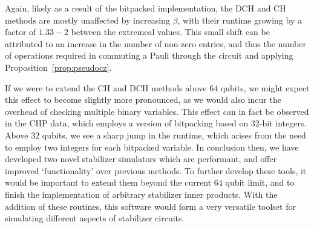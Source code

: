 Again, likely as a result of the bitpacked implementation, the DCH and CH methods are mostly unaffected by increasing $\beta$, with their runtime growing by a factor of $1.33-2$ between the extremeal values. This small shift can be attributed to an increase in the number of non-zero entries, and thus the number of operations required in commuting a Pauli through the circuit and applying Proposition~\ref{prop:pseudocz}.\par
If we were to extend the CH and DCH methods above $64$ qubits, we might expect this effect to become slightly more pronounced, as we would also incur the overhead of checking multiple binary variables. This effect can in fact be observed in the CHP data, which employs a version of bitpacking based on $32$-bit integers. Above $32$ qubits, we see a sharp jump in the runtime, which arises from the need to employ two integers for each bitpacked variable.
In conclusion then, we have developed two novel stabilizer simulators which are performant, and offer improved `functionality' over previous methods. To further develop these tools, it would be important to extend them beyond the current $64$ qubit limit, and to finish the implementation of arbitrary stabilizer inner products. With the addition of these routines, this software would form a very versatile toolset for simulating different aspects of stabilizer circuits.